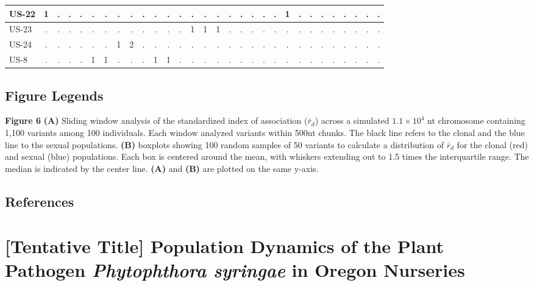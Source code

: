 \documentclass[double,12pt]{beavtex}
\begin{document}
\begin{tabular}{l|c|c|c|c|c|c|c|c|c|c|c|c|c|c|c|c|c|c|c|c|c|c|c|c|c|c|c|c|c}
  \hline
  US-22 & 1 & . & . & . & . & . & . & . & . & . & . & . & . & . & . & . & . & . & . & . & 1 & . & . & . & . & . & . & . & .\\
  \hline
  US-23 & . & . & . & . & . & . & . & . & . & . & . & . & 1 & 1 & 1 & . & . & . & . & . & . & . & . & . & . & . & . & . & .\\
  \hline
  US-24 & . & . & . & . & . & . & 1 & 2 & . & . & . & . & . & . & . & . & . & . & . & . & . & . & . & . & . & . & . & . & .\\
  \hline
  US-8 & . & . & . & . & 1 & 1 & . & . & . & 1 & 1 & . & . & . & . & . & . & . & . & . & . & . & . & . & . & . & . & . & .\\
  \hline
  \end{tabular}
  
  \section{Figure Legends}\label{figure-legends}
  
  \textbf{Figure 6} \textbf{(A)} Sliding window analysis of the
  standardized index of association (\(\bar{r}_d\)) across a simulated
  \(1.1 \times 10^4\) nt chromosome containing 1,100 variants among 100
  individuals. Each window analyzed variants within 500nt chunks. The
  black line refers to the clonal and the blue line to the sexual
  populations. \textbf{(B)} boxplots showing 100 random samples of 50
  variants to calculate a distribution of \(\bar{r}_d\) for the clonal
  (red) and sexual (blue) populations. Each box is centered around the
  mean, with whiskers extending out to 1.5 times the interquartile range.
  The median is indicated by the center line. \textbf{(A)} and
  \textbf{(B)} are plotted on the same y-axis.
  
  \section{References}\label{references}
  
  \chapter{\texorpdfstring{{[}Tentative Title{]} Population Dynamics of
  the Plant Pathogen \emph{Phytophthora syringae} in Oregon
  Nurseries}{{[}Tentative Title{]} Population Dynamics of the Plant Pathogen Phytophthora syringae in Oregon Nurseries}}\label{tentative-title-population-dynamics-of-the-plant-pathogen-phytophthora-syringae-in-oregon-nurseries}
  
\end{document}
